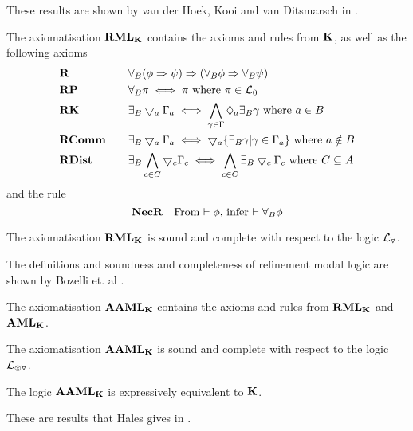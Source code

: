 These results are shown by van der Hoek, Kooi and van Ditsmarsch in \cite{hoek2008dynamic}.

\begin{defn} \label{axiomRML}
The axiomatisation $\bf RML_{\bf K}$ contains the axioms and rules from $\bf K$, as well as the following axioms
\begin{alignat*}{2}
	& \bf R && \quad \forall_B (\phi \Rightarrow \psi) \Rightarrow (\forall_B \phi \Rightarrow \forall_B \psi) \\
	& \bf RP && \quad \forall_B \pi \iff \pi \text{ where } \pi \in \mathcal{L}_0 \\
	& \bf RK && \quad\exists_B \bigtriangledown_a \Gamma_a \iff \bigwedge_{\gamma \in \Gamma} \Diamond_a \exists_B
	\gamma \text{ where } a \in B \\
	& \bf RComm && \quad \exists_B \bigtriangledown_a \Gamma_a \iff \bigtriangledown_a \{ \exists_B \gamma | \gamma \in
	\Gamma_a\} \text{ where } a \notin B\\
	& \bf RDist && \quad \exists_B \bigwedge_{c \in C} \bigtriangledown_c \Gamma_c \iff \bigwedge_{c \in C}
	\exists_B \bigtriangledown_c \Gamma_c \text{ where } C \subseteq A
\end{alignat*}
and the rule
\[
	\bf NecR \quad \text{From $\vdash \phi$, infer $\vdash \forall_B \phi$}
\]
\end{defn}

\begin{lemma} \label{axiomRMLSoundComplete}
The axiomatisation $\bf RML_{\bf K}$ is sound and complete with respect to the logic $\mathcal{L}_{\forall}$.
\end{lemma}

The definitions and soundness and completeness of refinement modal logic are shown by Bozelli et. al
\cite{DBLPjournalscorrabs12023538}.

\begin{defn} \label{axiomAAML}
The axiomatisation $\bf AAML_{\bf K}$ contains the axioms and rules from $\bf RML_{\bf K}$ and $\bf AML_{\bf K}$.
\end{defn}

\begin{thm} \label{axiomAAMLSoundComplete}
The axiomatisation $\bf AAML_{\bf K}$ is sound and complete with respect to the logic $\mathcal{L}_{\otimes\forall}$.
\end{thm}

\begin{thm} \label{thm:AAMLExpressivelyEquivalent}
The logic $\bf AAML_{\bf K}$ is expressively equivalent to $\bf K$.
\end{thm}

These are results that Hales gives in \cite{hales13synthesis}.
